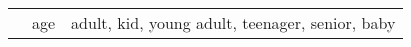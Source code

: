\documentclass[11pt,a4paper]{article}
\begin{document}
\begin{table*}[]
{\begin{tabular}{|l|l|l|}
                                                                                                 \\ \cline{2-3} 
                            & age        & adult, kid, young adult, teenager, senior, baby                                                                                                                                                                                                                                                                                                                                                                                                                                                                                                                                                                                                                                                                                                                                                                                                                                                                                                                                                                                                                                                                                                                                                                                                                                                                                                                                                                                                                                                                                                                                                                                                                                                                                                                                                                                                                                                                                                                                                                                                                                                                                                                                                                                                                                                                                                                                                                                                                                                                                                                                                                                                                                                                                                                                                                                                                                                                                                                                                                                                                                                                                                                                                  
\end{tabular}}
\end{table*}
\end{document}
